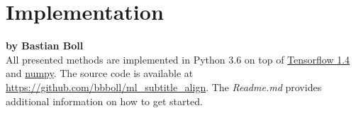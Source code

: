 \section{Implementation}

\textbf{by Bastian Boll} \\

All presented methods are implemented in Python 3.6 on top of \href{https://www.tensorflow.org/}{Tensorflow 1.4} and \href{http://www.numpy.org/}{numpy}. The source code is available at \url{https://github.com/bbboll/ml_subtitle_align}. The \emph{Readme.md} provides additional information on how to get started.